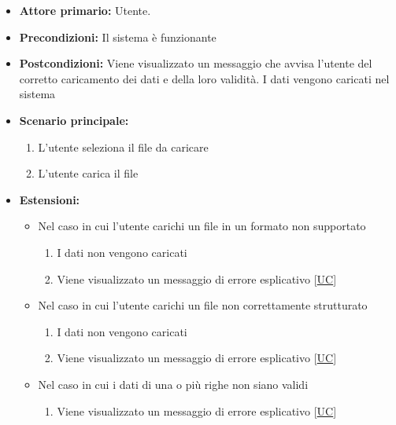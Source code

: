 \begin{itemize}
    \item \textbf{Attore primario:} Utente.
    \item \textbf{Precondizioni:} Il sistema è funzionante
    \item \textbf{Postcondizioni:} Viene visualizzato un messaggio che avvisa l'utente del corretto caricamento dei dati e della loro validità. 
                                   I dati vengono caricati nel sistema
    \item \textbf{Scenario principale:}
          \begin{enumerate}
              \item L'utente seleziona il file da caricare
              \item L'utente carica il file
          \end{enumerate}
    \item \textbf{Estensioni:}
    \begin{itemize}
        \item   Nel caso in cui l'utente carichi un file in un formato non supportato
                \begin{enumerate}
                    \item I dati non vengono caricati
                    \item Viene visualizzato un messaggio di errore esplicativo [\hyperref[sec:UC - Errore formato file]{UC}] %
                \end{enumerate}
        \item   Nel caso in cui l'utente carichi un file non correttamente strutturato
                \begin{enumerate}
                    \item I dati non vengono caricati
                    \item Viene visualizzato un messaggio di errore esplicativo [\hyperref[sec:UC - Errore struttura dataset]{UC}]
                \end{enumerate}
        \item   Nel caso in cui i dati di una o più righe non siano validi
                \begin{enumerate}
                    \item Viene visualizzato un messaggio di errore esplicativo [\hyperref[sec:UC - Errore validità riga]{UC}] %
                \end{enumerate}
    \end{itemize} 
\end{itemize}
\newpage


